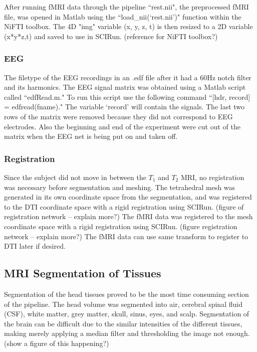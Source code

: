 After running fMRI data through the pipeline ``rest.nii", the preprocessed fMRI file, was opened in Matlab using the ``load\_nii(`rest.nii')" function within the NiFTI toolbox. The 4D "img" variable (x, y, z, t) is then resized to a 2D variable (x*y*z,t) and saved to use in SCIRun. (reference for NiFTI toolbox?)

\subsubsection{EEG}

The filetype of the EEG recordings in an .edf file after it had a 60Hz notch filter and its harmonics. The EEG signal matrix was obtained using a Matlab script called ``edfRead.m." To run this script use the following command ``[hdr, record] = edfread(fname)." The variable `record' will contain the signals. The last two rows of the matrix were removed because they did not correspond to EEG electrodes. Also the beginning and end of the experiment were cut out of the matrix when the EEG net is being put on and taken off. 

\subsubsection{Registration}

Since the subject did not move in between the $T_1$ and $T_2$ MRI, no registration was necessary before segmentation and meshing. The tetrahedral mesh was generated in its own coordinate space from the segmentation, and was registered to the DTI coordinate space with a rigid registration using SCIRun. (figure of registration network -- explain more?) The fMRI data was registered to the mesh coordinate space with a rigid registration using SCIRun. (figure registration network -- explain more?) The fMRI data can use same transform to register to DTI later if desired. 

\subsection{MRI Segmentation of Tissues}
\label{sec:Seg}


Segmentation of the head tissues proved to be the most time consuming section of the pipeline. The head volume was segmented into air, cerebral spinal fluid (CSF), white matter, grey matter, skull, sinus, eyes, and scalp. Segmentation of the brain can be difficult due to the similar intensities of the different tissues, making merely applying a median filter and thresholding the image not enough. (show a figure of this happening?)

